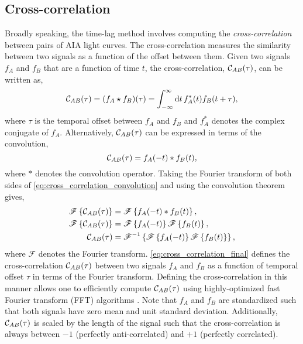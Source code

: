 \subsection{Cross-correlation}\label{subsec:cross_correlation}

Broadly speaking, the time-lag method involves computing the \textit{cross-correlation} between pairs of AIA light curves. The cross-correlation measures the similarity between two signals as a function of the offset between them. Given two signals $f_A$ and $f_B$ that are a function of time $t$, the cross-correlation, $\mathcal{C}_{AB}(\tau)$, can be written as,
\begin{equation}
    \mathcal{C}_{AB}(\tau) = (f_A\star f_B)(\tau) = \int_{-\infty}^\infty\textup{d}t\,f_A^{\ast}(t)f_B(t + \tau),
\end{equation}
where $\tau$ is the temporal offset between $f_A$ and $f_B$ and $f_A^{\ast}$ denotes the complex conjugate of $f_A$. Alternatively, $\mathcal{C}_{AB}(\tau)$ can be expressed in terms of the convolution,
\begin{equation}\label{eq:cross_correlation_convolution}
    \mathcal{C}_{AB}(\tau) = f_A(-t) \ast f_B(t),
\end{equation}
where $\ast$ denotes the convolution operator. Taking the Fourier transform of both sides of \autoref{eq:cross_correlation_convolution} and using the convolution theorem \citep[section 20.4]{arfken_mathematical_2013} gives,
\begin{align}\label{eq:cross_correlation_final}
    \mathscr{F}\left\{\mathcal{C}_{AB}(\tau)\right\} &= \mathscr{F}\left\{f_A(-t) \ast f_B(t)\right\}, \nonumber \\
    \mathscr{F}\left\{\mathcal{C}_{AB}(\tau)\right\} &= \mathscr{F}\left\{f_A(-t)\right\}\mathscr{F}\left\{f_B(t)\right\}, \nonumber \\
    \mathcal{C}_{AB}(\tau) &= \mathscr{F}^{-1}\left\{\mathscr{F}\left\{f_A(-t)\right\}\mathscr{F}\left\{f_B(t)\right\}\right\},
\end{align}
where $\mathscr{F}$ denotes the Fourier transform. \autoref{eq:cross_correlation_final} defines the cross-correlation $\mathcal{C}_{AB}(\tau)$ between two signals $f_A$ and $f_B$ as a function of temporal offset $\tau$ in terms of the Fourier transform. Defining the cross-correlation in this manner allows one to efficiently compute $\mathcal{C}_{AB}(\tau)$ using highly-optimized fast Fourier transform (FFT) algorithms \citep[e.g. the widely-used FFT algorithm developed by][]{cooley_algorithm_1965}. Note that $f_A$ and $f_B$ are standardized such that both signals have zero mean and unit standard deviation. Additionally, $\mathcal{C}_{AB}(\tau)$ is scaled by the length of the signal such that the cross-correlation is always between $-1$ (perfectly anti-correlated) and $+1$ (perfectly correlated).


